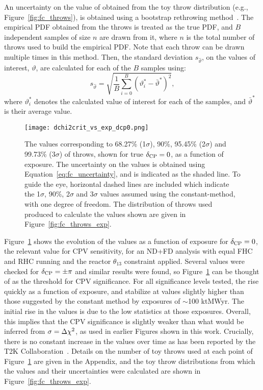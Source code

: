 An uncertainty on the value of \dchisqcrit obtained from the toy throw distribution (e.g., Figure~\ref{fig:fc_throws}), is obtained using a bootstrap rethrowing method~\cite{rice2006mathematical}. The empirical PDF obtained from the throws is treated as the true PDF, and $B$ independent samples of size $n$ are drawn from it, where $n$ is the total number of throws used to build the empirical PDF. Note that each throw can be drawn multiple times in this method. Then, the standard deviation $s_{\hat{\vartheta}}$, on the \dchisqcrit values of interest, $\vartheta$, are calculated for each of the $B$ samples using:
\begin{equation}
  s_{\hat{\vartheta}} = \sqrt{\frac{1}{B} \sum^{B}_{i=0} (\vartheta_{i}^{*} - \bar{\vartheta}^{*})^{2}},
  \label{eq:fc_uncertainty}
\end{equation}
where $\vartheta_{i}^{*}$ denotes the calculated \dchisqcrit value of interest for each of the samples, and $\bar{\vartheta}^{*}$ is their average value.

\begin{figure}[htbp]
  \centering
  \texttt{[image: dchi2crit\_vs\_exp\_dcp0.png]}
  \caption{The \dchisqcrit values corresponding to 68.27\% (1$\sigma$), 90\%, 95.45\% (2$\sigma$) and 99.73\% (3$\sigma$) of throws, shown for true $\delta_{\rm CP} = 0$, as a function of exposure. The uncertainty on the \dchisqcrit values is obtained using Equation~\ref{eq:fc_uncertainty}, and is indicated as the shaded line. To guide the eye, horizontal dashed lines are included which indicate the 1$\sigma$, 90\%, 2$\sigma$ and 3$\sigma$ \dchisq values assumed using the constant-\dchisq method, with one degree of freedom. The distribution of throws used produced to calculate the \dchisqcrit values shown are given in Figure~\ref{fig:fc_throws_exp}.}
  \label{fig:fc_vs_exp}
\end{figure}
Figure~\ref{fig:fc_vs_exp} shows the evolution of the \dchisqcrit values as a function of exposure for $\delta_{\rm CP} = 0$, the relevant value for CPV sensitivity, for an ND+FD analysis with equal FHC and RHC running and the reactor $\theta_{13}$ constraint applied. Several values were checked for $\delta_{\rm CP} = \pm\pi$ and similar results were found, so Figure~\ref{fig:fc_vs_exp} can be thought of as the threshold for CPV significance. For all significance levels tested, the \dchisqcrit rise quickly as a function of exposure, and stabilize at values slightly higher than those suggested by the constant \dchisq method by exposures of $\sim$100 ktMWyr. The initial rise in the \dchisqcrit values is due to the low statistics at those exposures. Overall, this implies that the CPV significance is slightly weaker than what would be inferred from $\sigma = \Delta\chi^{2}$, as used in earlier Figures shown in this work. Crucially, there is no constant increase in the \dchisqcrit values over time as has been reported by the T2K Collaboration~\cite{Abe:2021gky}. Details on the number of toy throws used at each point of Figure~\ref{fig:fc_vs_exp} are given in the Appendix, and the toy throw distributions from which the \dchisqcrit values and their uncertainties were calculated are shown in Figure~\ref{fig:fc_throws_exp}.

